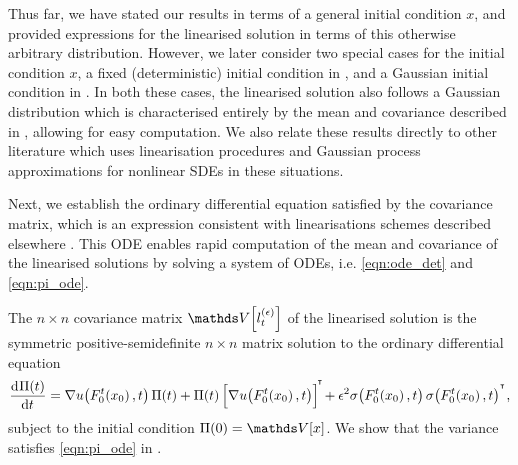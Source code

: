 Thus far, we have stated our results in terms of a general initial condition \(x\), and provided expressions for the linearised solution in terms of this otherwise arbitrary distribution.
However, we later consider two special cases for the initial condition \(x\), a fixed (deterministic) initial condition in , and a Gaussian initial condition in .
In both these cases, the linearised solution also follows a Gaussian distribution which is characterised entirely by the mean and covariance described in , allowing for easy computation.
We also relate these results directly to other literature \cite{Jazwinski_2014_StochasticProcessesFiltering,FreidlinWentzell_1998_RandomPerturbationsDynamical,Blagoveshchenskii_1962_DiffusionProcessesDepending,Balasuriya_2020_StochasticSensitivityComputable,Sanz-AlonsoStuart_2017_GaussianApproximationsSmall,SarkkaSolin_2019_AppliedStochasticDifferential} which uses linearisation procedures and Gaussian process approximations for nonlinear SDEs in these situations.

Next, we establish the ordinary differential equation satisfied by the covariance matrix, which is an expression consistent with linearisations schemes described elsewhere \cite{ArchambeauEtAl_2007_GaussianProcessApproximations,SarkkaSolin_2019_AppliedStochasticDifferential,Jazwinski_2014_StochasticProcessesFiltering,Sanz-AlonsoStuart_2017_GaussianApproximationsSmall}.
This ODE enables rapid computation of the mean and covariance of the linearised solutions by solving a system of ODEs, i.e. \cref{eqn:ode_det} and \cref{eqn:pi_ode}.

\begin{remark}\label{rem:cov_ode}
	The \(n\times n\) covariance matrix \(\var{l_t^{(\epsilon)}}\) of the linearised solution is the symmetric positive-semidefinite \(n \times n\) matrix solution to the ordinary differential equation
	\begin{equation}
		\dod{\Pi(t)}{t} = \begin{multlined}[t]
			\nabla u\!\left(F_0^t\!\left(x_0\right), t\right) \Pi(t) + \Pi(t)\left[\nabla u\!\left(F_0^t\!\left(x_0\right), t\right)\right]^{\!\T}\! + \epsilon^2\sigma\!\left(F_0^t\!\left(x_0\right), t\right)\sigma\!\left(F_0^t\!\left(x_0\right), t\right)^{\T}\!,
		\end{multlined}
		\label{eqn:pi_ode}
	\end{equation}
	subject to the initial condition \(\Pi(0) = \var{x}\).
	We show that the variance satisfies \cref{eqn:pi_ode} in .
\end{remark}





